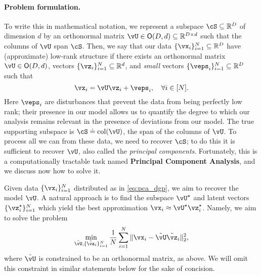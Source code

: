 \documentclass[../../book-main.tex]{subfiles}
\begin{document}
\paragraph{Problem formulation.}
To write this in mathematical notation, we represent a subspace \(\cS \subseteq \R^{D}\) of dimension \(d\)  by an orthonormal matrix \(\vU \in \O(D, d) \subseteq \R^{D \times d}\) such that the columns of \(\vU\) span \(\cS\). Then, we say that our data \(\{\vx_{i}\}_{i = 1}^{N} \subseteq \R^{D}\) have (approximate) low-rank structure if there exists an orthonormal matrix \(\vU \in \O(D, d)\), vectors \(\{\vz_{i}\}_{i = 1}^{N} \subseteq \R^{d}\), and \textit{small} vectors \(\{\veps_{i}\}_{i = 1}^{N} \subseteq \R^{D}\) such that 
\begin{equation}\label{eq:pca_dgp}
    \vx_{i} = \vU\vz_{i} + \veps_{i}, \quad \forall i \in [N].
\end{equation}
Here \(\veps_{i}\) are disturbances that prevent the data from being perfectly
low rank; their presence in our model allows us to quantify the degree to which
our analysis remains relevant in the presence of deviations from our model. The
true supporting subspace is \(\cS \doteq \mathop{\mathrm{col}}(\vU)\), the span of
the columns of $\vU$. To process all we can from
these data, we need to recover \(\cS\); to do this it is sufficient to recover
\(\vU\), also called the \textit{principal components}. Fortunately, this is
a computationally tractable task named {\bf Principal Component Analysis}, and
we discuss now how to solve it.

Given data \(\{\vx_{i}\}_{i = 1}^{N}\) distributed as in \eqref{eq:pca_dgp}, we
aim to recover the model \(\vU\). A natural approach is to find the subspace
\(\vU^{\star}\) and latent vectors \(\{\vz_{i}^{\star}\}_{i = 1}^{N}\) which
yield the best approximation \(\vx_{i} \approx \vU^{\star}\vz_{i}^{\star}\). Namely, we aim to solve the problem 
\begin{equation}\label{eq:pca_sparse_recovery_problem}
    \min_{\tilde{\vU}, \{\tilde{\vz}_{i}\}_{i = 1}^{N}}\frac{1}{N}\sum_{i = 1}^{N}\norm{\vx_{i} - \tilde{\vU}\tilde{\vz}_{i}}_{2}^{2},
\end{equation}
where $\tilde{\vU}$ is constrained to be an orthonormal matrix, as above. We will omit
this constraint in similar statements below for the sake of concision.
\end{document}
